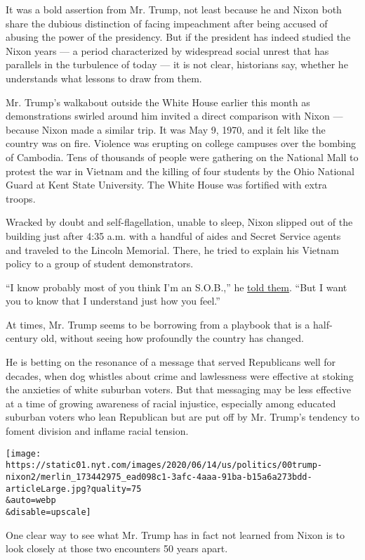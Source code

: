 It was a bold assertion from Mr. Trump, not least because he and Nixon
both share the dubious distinction of facing impeachment after being
accused of abusing the power of the presidency. But if the president has
indeed studied the Nixon years --- a period characterized by widespread
social unrest that has parallels in the turbulence of today --- it is
not clear, historians say, whether he understands what lessons to draw
from them.

Mr. Trump's walkabout outside the White House earlier this month as
demonstrations swirled around him invited a direct comparison with Nixon
--- because Nixon made a similar trip. It was May 9, 1970, and it felt
like the country was on fire. Violence was erupting on college campuses
over the bombing of Cambodia. Tens of thousands of people were gathering
on the National Mall to protest the war in Vietnam and the killing of
four students by the Ohio National Guard at Kent State University. The
White House was fortified with extra troops.

Wracked by doubt and self-flagellation, unable to sleep, Nixon slipped
out of the building just after 4:35 a.m. with a handful of aides and
Secret Service agents and traveled to the Lincoln Memorial. There, he
tried to explain his Vietnam policy to a group of student demonstrators.

``I know probably most of you think I'm an S.O.B.,'' he
\href{https://www.youtube.com/watch?v=opK4XeVEE1Y}{told them}. ``But I
want you to know that I understand just how you feel.''

At times, Mr. Trump seems to be borrowing from a playbook that is a
half-century old, without seeing how profoundly the country has changed.

He is betting on the resonance of a message that served Republicans well
for decades, when dog whistles about crime and lawlessness were
effective at stoking the anxieties of white suburban voters. But that
messaging may be less effective at a time of growing awareness of racial
injustice, especially among educated suburban voters who lean Republican
but are put off by Mr. Trump's tendency to foment division and inflame
racial tension.

\texttt{[image: https://static01.nyt.com/images/2020/06/14/us/politics/00trump-nixon2/merlin\_173442975\_ead098c1-3afc-4aaa-91ba-b15a6a273bdd-articleLarge.jpg?quality=75\\\&auto=webp\\\&disable=upscale]}

One clear way to see what Mr. Trump has in fact not learned from Nixon
is to look closely at those two encounters 50 years apart.

